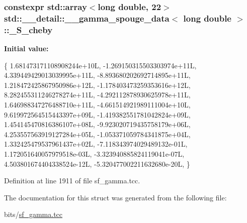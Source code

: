 \subsubsection[{\texorpdfstring{\+\_\+\+S\+\_\+cheby}{_S_cheby}}]{\setlength{\rightskip}{0pt plus 5cm}constexpr std\+::array$<$long double, 22$>$ {\bf std\+::\+\_\+\+\_\+detail\+::\+\_\+\+\_\+gamma\+\_\+spouge\+\_\+data}$<$ long double $>$\+::\+\_\+\+S\+\_\+cheby\hspace{0.3cm}{\ttfamily [static]}}\hypertarget{structstd_1_1____detail_1_1____gamma__spouge__data_3_01long_01double_01_4_ad1b0c2af63c28d0eaff89430d1b54589}{}\label{structstd_1_1____detail_1_1____gamma__spouge__data_3_01long_01double_01_4_ad1b0c2af63c28d0eaff89430d1b54589}
{\bfseries Initial value\+:}
\begin{DoxyCode}
\{
     1.681473171108908244e+10L,
    -1.269150315503303974e+11L,
     4.339449429013039995e+11L,
    -8.893680202692714895e+11L,
     1.218472425867950986e+12L,
    -1.178403473259353616e+12L,
     8.282455311246278274e+11L,
    -4.292112878930625978e+11L,
     1.646988347276488710e+11L,
    -4.661514921989111004e+10L,
     9.619972564515443397e+09L,
    -1.419382551781042824e+09L,
     1.454145470816386107e+08L,
    -9.923020719435758179e+06L,
     4.253557563919127284e+05L,
    -1.053371059784341875e+04L,
     1.332425479537961437e+02L,
    -7.118343974029489132e-01L,
     1.172051640057979518e-03L,
    -3.323940885824119041e-07L,
     4.503801674404338524e-12L,
    -5.320477002211632680e-20L,
      \}
\end{DoxyCode}


Definition at line 1911 of file sf\+\_\+gamma.\+tcc.



The documentation for this struct was generated from the following file\+:\begin{DoxyCompactItemize}
\item 
bits/\hyperlink{sf__gamma_8tcc}{sf\+\_\+gamma.\+tcc}\end{DoxyCompactItemize}
